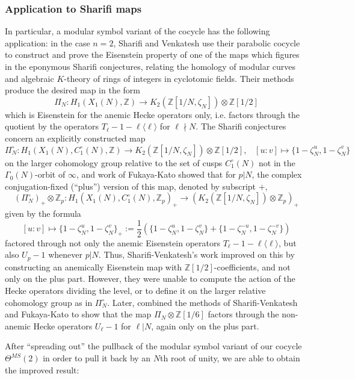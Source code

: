 \documentclass[10pt]{amsart}
\theoremstyle{definition}
\newcommand{\Z}{\mathbb{Z}}
\numberwithin{equation}{section}
\begin{document}
    \subsubsection{Application to Sharifi maps}
    In particular, a modular symbol variant of the cocycle has the following application: in the case $n=2$, Sharifi and Venkatesh use their parabolic cocycle to construct and prove the Eisenstein property of one of the maps which figures in the eponymous Sharifi conjectures, relating the homology of modular curves and algebraic $K$-theory of rings of integers in cyclotomic fields. Their methods produce the desired map in the form
    \[
    \Pi_N: H_1(X_1(N),\Z) \to K_2(\Z[1/N,\zeta_N]) \otimes \Z[1/2]
    \]
    which is Eisenstein for the anemic Hecke operators only, i.e. factors through the quotient by the operators $T_\ell - 1-\ell\langle \ell\rangle$ for $\ell \nmid N$. The Sharifi conjectures concern an explicitly constructed map 
    \[
    \Pi_N^\circ: H_1(X_1(N),C_1^\circ(N),\Z) \to  K_2(\Z[1/N,\zeta_N]) \otimes \Z[1/2], \;\;\;[u:v]\mapsto \{1-\zeta_N^u, 1-\zeta_N^v\}
    \]
    on the larger cohomology group relative to the set of cusps $C_1^\circ(N)$ not in the $\Gamma_0(N)$-orbit of $\infty$, and work of Fukaya-Kato \cite{FK} showed that for $p|N$, the complex conjugation-fixed (``plus'') version of this map, denoted by subscript $+$,
    \[
    (\Pi_N^\circ)_+\otimes \Z_p: H_1(X_1(N),C_1^\circ(N),\Z_p)_+ \to  (K_2(\Z[1/N,\zeta_N]) \otimes \Z_p)_+
    \]
    given by the formula
    \[
    [u:v]\mapsto \{1-\zeta_N^u, 1-\zeta_N^v\}_+ := \frac{1}{2}(\{1-\zeta_N^u, 1-\zeta_N^v\}+ \{1-\zeta_N^{-u}, 1-\zeta_N^{-v}\})
    \]
    factored through not only the anemic Eisenstein operators $T_\ell - 1-\ell\langle \ell\rangle$, but also $U_p - 1$ whenever $p | N$. Thus, Sharifi-Venkatesh's work improved on this by constructing an anemically Eisenstein map with $\Z[1/2]$-coefficients, and not only on the plus part. However, they were unable to compute the action of the Hecke operators dividing the level, or to define it on the larger relative cohomology group as in $\Pi_N^\circ$. Later, \cite{LcW} combined the methods of Sharifi-Venkatesh and Fukaya-Kato to show that the map $\Pi_N\otimes \Z[1/6]$ factors through the non-anemic Hecke operators $U_\ell - 1$ for $\ell|N$, again only on the plus part.

    After ``spreading out'' the pullback of the modular symbol variant of our cocycle $\Theta^{MS}(2)$ in order to pull it back by an $N$th root of unity, we are able to obtain the improved result:
\end{document}
